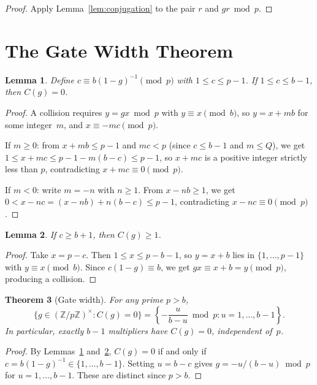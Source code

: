 \documentclass[12pt]{amsart}
\newtheorem{theorem}{Theorem}
\newtheorem{lemma}[theorem]{Lemma}
\theoremstyle{definition}
\theoremstyle{remark}
\begin{document}
\begin{proof}
Apply Lemma~\ref{lem:conjugation} to the pair $r$ and
$gr \bmod p$.
\end{proof}

\section{The Gate Width Theorem}

\begin{lemma}\label{lem:no-collision}
Define $c \equiv b(1{-}g)^{-1} \pmod{p}$ with
$1 \le c \le p{-}1$. If $1 \le c \le b{-}1$, then
$C(g) = 0$.
\end{lemma}

\begin{proof}
A collision requires $y = gx \bmod p$ with
$y \equiv x \pmod{b}$, so $y = x + mb$ for some
integer~$m$, and $x \equiv -mc \pmod{p}$.

If $m \ge 0$: from $x + mb \le p{-}1$ and $mc < p$
(since $c \le b{-}1$ and $m \le Q$), we get
$1 \le x + mc \le p{-}1{-}m(b{-}c) \le p{-}1$, so
$x + mc$ is a positive integer strictly less than $p$,
contradicting $x + mc \equiv 0 \pmod{p}$.

If $m < 0$: write $m = -n$ with $n \ge 1$. From
$x - nb \ge 1$, we get
$0 < x - nc = (x{-}nb) + n(b{-}c) \le p{-}1$,
contradicting $x - nc \equiv 0 \pmod{p}$.
\end{proof}

\begin{lemma}\label{lem:collision-exists}
If $c \ge b + 1$, then $C(g) \ge 1$.
\end{lemma}

\begin{proof}
Take $x = p - c$. Then $1 \le x \le p{-}b{-}1$, so
$y = x + b$ lies in $\{1, \ldots, p{-}1\}$ with
$y \equiv x \pmod{b}$. Since $c(1{-}g) \equiv b$, we
get $gx \equiv x + b = y \pmod{p}$, producing a
collision.
\end{proof}

\begin{theorem}[Gate width]\label{thm:gate-width}
For any prime $p > b$,
\[
\{g \in (\mathbb{Z}/p\mathbb{Z})^{\times} : C(g) = 0\}
= \left\{-\frac{u}{b - u} \bmod p :
u = 1, \ldots, b{-}1\right\}.
\]
In particular, exactly $b - 1$ multipliers have $C(g) = 0$,
independent of~$p$.
\end{theorem}

\begin{proof}
By Lemmas~\ref{lem:no-collision}
and~\ref{lem:collision-exists}, $C(g) = 0$ if and only if
$c = b(1{-}g)^{-1} \in \{1, \ldots, b{-}1\}$. Setting
$u = b - c$ gives $g = -u/(b{-}u) \bmod p$ for
$u = 1, \ldots, b{-}1$. These are distinct since
$p > b$.
\end{proof}
\end{document}

